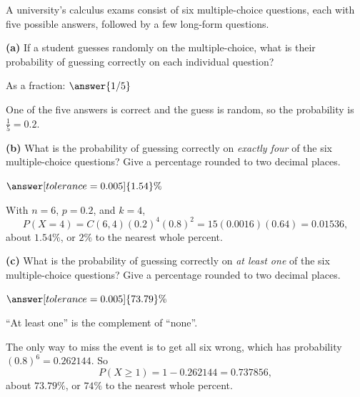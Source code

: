 \documentclass[12pt]{ximera}
\begin{document}
\begin{problem}
A university's calculus exams consist of six multiple-choice questions, each with
five possible answers, followed by a few long-form questions.

\begin{prompt}
\textbf{(a)} If a student guesses randomly on the multiple-choice, what is their
probability of guessing correctly on each individual question?

As a fraction: $\answer{1/5}$

\begin{feedback}
One of the five answers is correct and the guess is random, so the probability is
$\frac15=0.2$.
\end{feedback}
\end{prompt}

\begin{prompt}
\textbf{(b)} What is the probability of guessing correctly on \emph{exactly four} of the
six multiple-choice questions? Give a percentage rounded to two decimal places.

$\answer[tolerance=0.005]{1.54}\%$

\begin{feedback}
With $n=6$, $p=0.2$, and $k=4$,
\[ P(X=4)=C(6,4)(0.2)^4(0.8)^2=15(0.0016)(0.64)=0.01536, \]
about $1.54\%$, or $2\%$ to the nearest whole percent.
\end{feedback}
\end{prompt}

\begin{prompt}
\textbf{(c)} What is the probability of guessing correctly on \emph{at least one} of the
six multiple-choice questions? Give a percentage rounded to two decimal places.

$\answer[tolerance=0.005]{73.79}\%$

\begin{hint}
``At least one'' is the complement of ``none''.
\end{hint}

\begin{feedback}
The only way to miss the event is to get all six wrong, which has probability
$(0.8)^6=0.262144$. So
\[ P(X\ge 1)=1-0.262144=0.737856, \]
about $73.79\%$, or $74\%$ to the nearest whole percent.
\end{feedback}
\end{prompt}
\end{problem}
\end{document}
